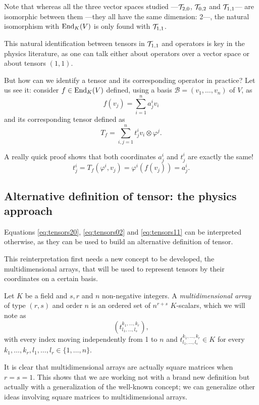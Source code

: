 Note that whereas all the three vector spaces studied ---${\mathcal T}_{2,0}$, ${\mathcal T}_{0,2}$ and ${\mathcal T}_{1,1}$--- are isomorphic between them ---they all have the same dimension: 2---, the natural isomorphism with $\operatorname{End}_K(V)$ is only found with ${\mathcal T}_{1,1}$.

\begin{remark}
	This natural identification between tensors in ${\mathcal T}_{1,1}$ and operators is key in the physics literature, as one can talk either about operators over a vector space or about tensors $(1,1)$.

	But how can we identify a tensor and its corresponding operator in practice? Let us see it: consider $f \in \operatorname{End}_K(V)$ defined, using a basis $\mathcal{B} = (v_1, \dots, v_n)$ of $V$, as
	\[
		f(v_j) = \sum_{i=1}^n a^i_j v_i
	\]
	and its corresponding tensor defined as
	\[
		T_f = \sum_{i,j=1}^n t^i_j v_i \otimes \varphi^j.
	\]

	A really quick proof shows that both coordinates $a^i_j$ and $t^i_j$ are exactly the same!
	\[
		t^i_j = T_f(\varphi^i, v_j) = \varphi^i(f(v_j)) = a^i_j.
	\]
\end{remark}

\subsection{Alternative definition of tensor: the physics approach}

Equations \ref{eq:tensors20}, \ref{eq:tensors02} and \ref{eq:tensors11} can be interpreted otherwise, as they can be used to build an alternative definition of tensor.

This reinterpretation first needs a new concept to be developed, the multidimensional arrays, that will be used to represent tensors by their coordinates on a certain basis.

\begin{definition}
	Let $K$ be a field and $s, r$ and $n$ non-negative integers. A \emph{multidimensional array} of type $(r,s)$ and order $n$ is an ordered set of $n^{r+s}$ $K$-scalars, which we will note as
	\[
	\left( t^{k_1, \dots, k_r}_{l_1, \dots, l_s} \right),
	\]
	with every index moving independently from 1 to $n$ and $t^{k_1, \dots, k_r}_{l_1, \dots, l_s} \in K$ for every $k_1, \dots, k_r, l_1, \dots, l_r \in \{1, \dots, n\}$.
\end{definition}

It is clear that multidimensional arrays are actually square matrices when $r = s = 1$. This shows that we are working not with a brand new definition but actually with a generalization of the well-known concept; we can generalize other ideas involving square matrices to multidimensional arrays.

